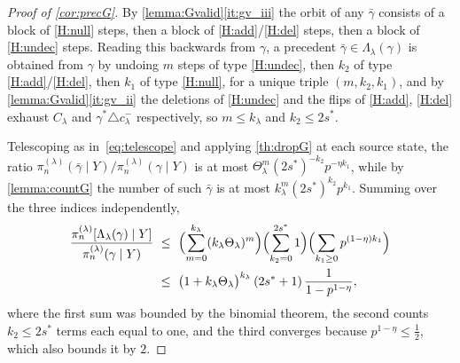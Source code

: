 \begin{proof}[Proof of \cref{cor:precG}]
    By \cref{lemma:Gvalid}\ref{it:gv_iii} the orbit of any $\bar\gamma$
    consists of a block of \ref{H:null} steps, then a block of
    \ref{H:add}/\ref{H:del} steps, then a block of \ref{H:undec} steps.
    Reading this backwards from $\gamma$, a precedent
    $\bar\gamma\in\Lambda_\lambda(\gamma)$ is obtained from $\gamma$ by
    undoing $m$ steps of type \ref{H:undec}, then $k_2$ of type
    \ref{H:add}/\ref{H:del}, then $k_1$ of type \ref{H:null}, for a
    unique triple $(m,k_2,k_1)$, and by \cref{lemma:Gvalid}\ref{it:gv_ii}
    the deletions of \ref{H:undec} and the flips of \ref{H:add},
    \ref{H:del} exhaust $C_\lambda$ and
    $\gamma^{\ast}\triangle c^{-}_\lambda$ respectively, so
    $m\leq k_\lambda$ and $k_2\leq2s^{\ast}$.

    Telescoping as in~\eqref{eq:telescope} and applying \cref{th:dropG}
    at each source state, the ratio
    $\pi_n^{(\lambda)}(\bar\gamma\mid Y)/\pi_n^{(\lambda)}(\gamma\mid Y)$
    is at most $\Theta_\lambda^{m}(2s^{\ast})^{-k_2}p^{-\eta k_1}$, while
    by \cref{lemma:countG} the number of such $\bar\gamma$ is at most
    $k_\lambda^{m}(2s^{\ast})^{k_2}p^{k_1}$. Summing over the three
    indices independently,
    \begin{align*}
        \frac{\pi_n^{(\lambda)}[\Lambda_\lambda(\gamma)\mid Y]}
        {\pi_n^{(\lambda)}(\gamma\mid Y)}
        &\ \leq\
        \Bigl(\sum_{m=0}^{k_\lambda}(k_\lambda\Theta_\lambda)^{m}\Bigr)
        \Bigl(\sum_{k_2=0}^{2s^{\ast}}1\Bigr)
        \Bigl(\sum_{k_1\geq0}p^{(1-\eta)k_1}\Bigr)\\
        &\ \leq\ \bigl(1+k_\lambda\Theta_\lambda\bigr)^{k_\lambda}
        \,(2s^{\ast}+1)\,\frac{1}{1-p^{1-\eta}},
    \end{align*}
    where the first sum was bounded by the binomial theorem, the second
    counts $k_2\leq2s^{\ast}$ terms each equal to one, and the third
    converges because $p^{1-\eta}\leq\tfrac12$, which also bounds it by
    $2$.
\end{proof}

